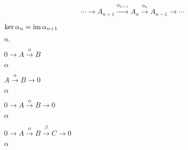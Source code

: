\documentclass[10pt]{book}
\begin{document}
\begin{mdSnippets}
\begin{mdDisplaySnippet}[6aa407a33fe855f5432fd5cc17734800]
\[%
\cdots \longrightarrow A_{n+1}
\overset{\alpha_{n+1}}{\longrightarrow} A_n
\overset{\alpha_{n}}{\longrightarrow} A_{n-1}
\longrightarrow \cdots
\]%
\end{mdDisplaySnippet}%
\begin{mdInlineSnippet}[28cbf9ed836d1fc2711ab9f71fd7709b]%
$\ker\alpha_n = \operatorname{im}\alpha_{n+1}$\end{mdInlineSnippet}%
\begin{mdInlineSnippet}[36cb6ed5283e452800c275dd6934aecc]%
$n.$\end{mdInlineSnippet}%
\begin{mdInlineSnippet}%
$0 \longrightarrow A \overset{\alpha}{\longrightarrow} B$\end{mdInlineSnippet}%
\begin{mdInlineSnippet}[7b7f9dbfea05c83784f8b85149852f08]%
$\alpha$\end{mdInlineSnippet}%
\begin{mdInlineSnippet}[cbd9c5d52529107e89d1a87fe9c8d48f]%
$A \overset{\alpha}{\longrightarrow} B \longrightarrow 0$\end{mdInlineSnippet}%
\begin{mdInlineSnippet}[7b7f9dbfea05c83784f8b85149852f08]%
$\alpha$\end{mdInlineSnippet}%
\begin{mdInlineSnippet}[a93e9015ea023f7e48610706754e05b4]%
$0 \longrightarrow A \overset{\alpha}{\longrightarrow} B \longrightarrow 0$\end{mdInlineSnippet}%
\begin{mdInlineSnippet}[7b7f9dbfea05c83784f8b85149852f08]%
$\alpha$\end{mdInlineSnippet}%
\begin{mdInlineSnippet}[d554924e0393e32311fe97685b7e2746]%
$0 \longrightarrow A \overset{\alpha}{\longrightarrow} B \overset{\beta}{\longrightarrow} C \longrightarrow 0$\end{mdInlineSnippet}%
\begin{mdInlineSnippet}[7b7f9dbfea05c83784f8b85149852f08]%
$\alpha$\end{mdInlineSnippet}%
\begin{mdInlineSnippet}%

\end{mdInlineSnippet}
\end{mdSnippets}
\end{document}
